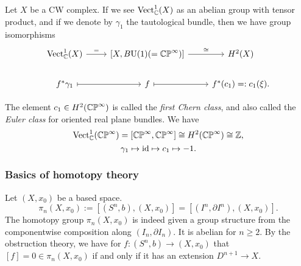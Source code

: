 \documentclass{../../../small}
\begin{document}
\begin{thm*}[4.1]
Let $X$ be a CW complex.
If we see $\mathrm{Vect}_{\mathbb{C}}^1(X)$ as an abelian group with tensor product, and if we denote by $\gamma_1$ the tautological bundle, then we have group isomorphisms
\[\begin{tikzcd}
\mathrm{Vect}_\C^1(X) \ar{r}{=} & {[X,B\rU(1)(=\CP^\infty)]} \ar{r}{\cong} & H^2(X) \\
f^*\gamma_1 \ar[|->]{r} & f \ar[|->]{r} & f^*(c_1)=:c_1(\xi).
\end{tikzcd}\]
\end{thm*}

The element $c_1\in H^2(\mathbb{CP}^\infty)$ is called the \emph{first Chern class}, and also called the \emph{Euler class} for oriented real plane bundles.
We have
\[\mathrm{Vect}_{\mathbb{C}}^1(\mathbb{CP}^\infty)=[\mathbb{CP}^\infty,\mathbb{CP}^\infty]\cong H^2(\mathbb{CP}^\infty)\cong\mathbb{Z},\]
\[\gamma_1\mapsto\operatorname{id}\mapsto c_1\mapsto -1.\]



\bigskip
\subsubsection*{Basics of homotopy theory}
Let $(X,x_0)$ be a based space.
\[\pi_n(X,x_0):=[(S^n,b),(X,x_0)]=[(I^n,\partial I^n),(X,x_0)].\]
The homotopy group $\pi_n(X,x_0)$ is indeed given a group structure from the componentwise composition along $(I_n,\partial I_n)$.
It is abelian for $n\ge2$.
By the obstruction theory, we have for $f:(S^n,b)\to(X,x_0)$ that $[f]=0\in\pi_n(X,x_0)$ if and only if it has an extension $D^{n+1}\to X$.

\bigskip
\end{document}
